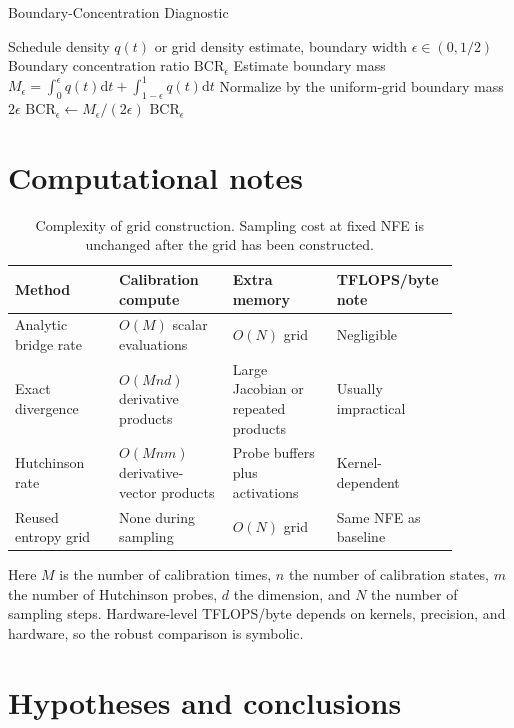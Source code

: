 \documentclass{article}
\newcommand{\dd}{\mathrm{d}}
\newcommand{\bcr}{\mathrm{BCR}}
\theoremstyle{plain}
\theoremstyle{definition}
\theoremstyle{remark}
\begin{document}
\begin{algorithm}[H]
  \caption{Boundary-Concentration Diagnostic}
  \label{alg:bcr}
  \begin{algorithmic}[1]
    \REQUIRE Schedule density $q(t)$ or grid density estimate, boundary width $\epsilon\in(0,1/2)$
    \ENSURE Boundary concentration ratio $\bcr_\epsilon$
    \STATE Estimate boundary mass $M_\epsilon=\int_0^\epsilon q(t)\dd t+\int_{1-\epsilon}^1q(t)\dd t$
    \STATE Normalize by the uniform-grid boundary mass $2\epsilon$
    \STATE $\bcr_\epsilon\leftarrow M_\epsilon/(2\epsilon)$
    \RETURN $\bcr_\epsilon$
  \end{algorithmic}
\end{algorithm}

\section{Computational notes}
\label{app:compute}

\begin{table}[H]
  \caption{Complexity of grid construction. Sampling cost at fixed NFE is unchanged after the grid has been constructed.}
  \label{tab:complexity}
  \centering
  \small
  \begin{tabular}{P{0.22\linewidth}P{0.24\linewidth}P{0.22\linewidth}P{0.20\linewidth}}
    \toprule
    Method & Calibration compute & Extra memory & TFLOPS/byte note \\
    \midrule
    Analytic bridge rate & $O(M)$ scalar evaluations & $O(N)$ grid & Negligible \\
    Exact divergence & $O(Mnd)$ derivative products & Large Jacobian or repeated products & Usually impractical \\
    Hutchinson rate & $O(Mnm)$ derivative-vector products & Probe buffers plus activations & Kernel-dependent \\
    Reused entropy grid & None during sampling & $O(N)$ grid & Same NFE as baseline \\
    \bottomrule
  \end{tabular}
\end{table}

Here $M$ is the number of calibration times, $n$ the number of calibration states, $m$ the number of Hutchinson probes, $d$ the dimension, and $N$ the number of sampling steps. Hardware-level TFLOPS/byte depends on kernels, precision, and hardware, so the robust comparison is symbolic.

\section{Hypotheses and conclusions}
\label{app:hypotheses}
\end{document}
